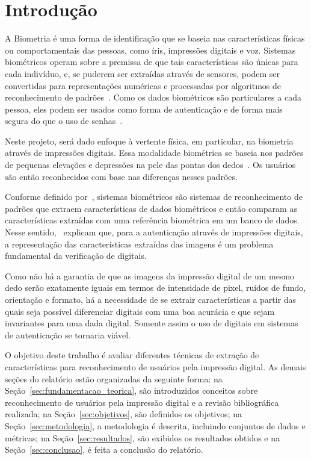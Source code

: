 \section{Introdução}\label{sec:introduacao}

A Biometria é uma forma de identificação que se baseia nas características físicas ou comportamentais das pessoas, como íris, impressões digitais e voz. Sistemas biométricos operam sobre a premissa de que tais características são únicas para cada indivíduo, e, se puderem ser extraídas através de sensores, podem ser convertidas para representações numéricas e processadas por algoritmos de reconhecimento de padrões~\cite{handbook_of_biometrics}. Como os dados biométricos são particulares a cada pessoa, eles podem ser usados como forma de autenticação e de forma mais segura do que o uso de senhas~\cite{biometrics_a_tool_for_information_security}. 

Neste projeto, será dado enfoque à vertente física, em particular, na biometria através de impressões digitais. Essa modalidade biométrica se baseia nos padrões de pequenas elevações e depressões na pele das pontas dos dedos~\cite{handbook_of_fp_recognition}. Os usuários são então reconhecidos com base nas diferenças nesses padrões.

Conforme definido por~, sistemas biométricos são sistemas de reconhecimento de padrões que extraem características de dados biométricos e então comparam as características extraídas com uma referência biométrica em um banco de dados. Nesse sentido,~ explicam que, para a autenticação através de impressões digitais, a representação das características extraídas das imagens é um problema fundamental da verificação de digitais. 

Como não há a garantia de que as imagens da impressão digital de um mesmo dedo serão exatamente iguais em termos de intensidade de pixel, ruídos de fundo, orientação e formato, há a necessidade de se extrair características a partir das quais seja possível diferenciar digitais com uma boa acurácia e que sejam invariantes para uma dada digital. Somente assim o uso de digitais em sistemas de autenticação se tornaria viável.

O objetivo deste trabalho é avaliar diferentes técnicas de extração de características para reconhecimento de usuários pela impressão digital. As demais seções do relatório estão organizadas da seguinte forma: na Seção~\ref{sec:fundamentacao_teorica}, são introduzidos conceitos sobre reconhecimento de usuários pela impressão digital e a revisão bibliográfica realizada; na Seção~\ref{sec:objetivos}, são definidos os objetivos; na Seção~\ref{sec:metodologia}, a metodologia é descrita, incluindo conjuntos de dados e métricas; na Seção~\ref{sec:resultados}, são exibidos os resultados obtidos e na Seção~\ref{sec:conclusao}, é feita a conclusão do relatório.

